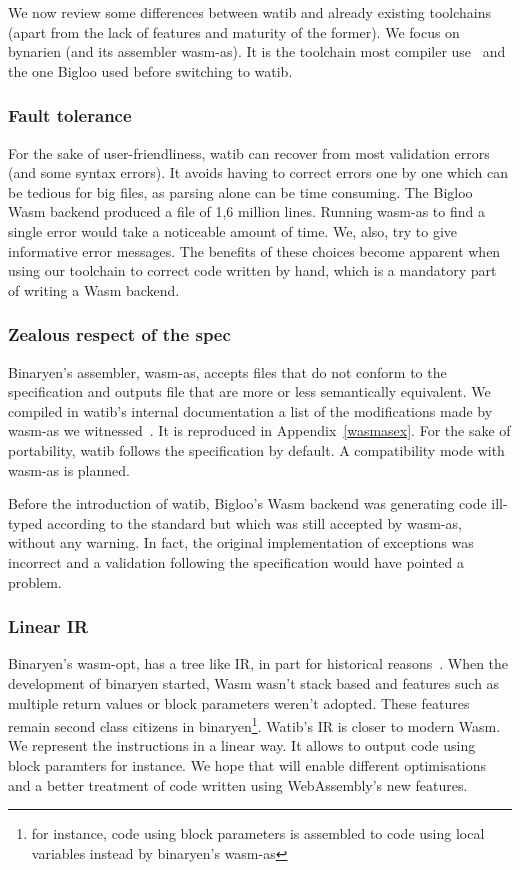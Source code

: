 \documentclass[10pt]{article}
\begin{document}
We now review some differences between \textsf{watib} and already existing
toolchains (apart from the lack of features and maturity of the former). We
focus on bynarien (and its assembler \textsf{wasm-as}). It is the toolchain most
compiler use~\cite{Binaryen} and the one Bigloo used before switching to
\textsf{watib}.
\subsubsection{Fault tolerance}
For the sake of user-friendliness, \textsf{watib} can recover from most
validation errors (and some syntax errors). It avoids having to correct errors
one by one which can be tedious for big files, as parsing alone can be time
consuming. The Bigloo Wasm backend produced a file of 1,6 million lines. Running
\textsf{wasm-as} to find a single error would take a noticeable amount of time.
We, also, try to give informative error messages. The benefits of these choices
become apparent when using our toolchain to correct code written by hand, which
is a mandatory part of writing a Wasm backend.

\subsubsection{{Zealous\protect\footnotemark} respect of the spec}
Binaryen's assembler, \textsf{wasm-as}, accepts files that do not conform to the
specification and outputs file that are more or less semantically equivalent. We
compiled in \textsf{watib}'s internal documentation a list of the modifications
made by \textsf{wasm-as} we witnessed~\cite{WasmAsExtension}. It is reproduced
in Appendix~\ref{wasmasex}. For the sake of portability, watib follows the
specification by default. A compatibility mode with \textsf{wasm-as} is
planned.

Before the introduction of watib, Bigloo's Wasm backend was generating code
ill-typed according to the standard but which was still accepted by
\textsf{wasm-as}, without any warning. In fact, the original implementation of
exceptions was incorrect and a validation following the specification would have
pointed a problem.

\subsubsection{Linear IR}
Binaryen's \textsf{wasm-opt}, has a tree like IR, in part for historical
reasons~\cite{BinaryenIR}. When the development of binaryen started, Wasm wasn't
stack based and features such as multiple return values or block parameters
weren't adopted. These features remain second class citizens in
binaryen\footnote{for instance, code using block parameters is assembled to code
using local variables instead by binaryen's \textsf{wasm-as}}. \textsf{Watib}'s
IR is closer to modern Wasm. We represent the instructions in a linear way. It
allows to output code using block paramters for instance. We hope that will
enable different optimisations and a better treatment of code written using
WebAssembly's new features.
\end{document}
